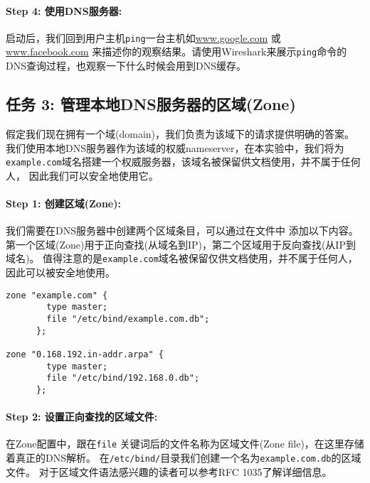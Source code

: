 \paragraph{Step 4: 使用DNS服务器:}
启动后，我们回到用户主机\texttt{ping}一台主机如\url{www.google.com} 或 \url{www.facebook.com}
来描述你的观察结果。请使用Wireshark来展示\texttt{ping}命令的DNS查询过程，也观察一下什么时候会用到DNS缓存。



\subsection{任务 3: 管理本地DNS服务器的区域(Zone)}

假定我们现在拥有一个域(domain)，我们负责为该域下的请求提供明确的答案。
我们使用本地DNS服务器作为该域的权威nameserver，在本实验中，我们将为
\texttt{example.com}域名搭建一个权威服务器，该域名被保留供文档使用，并不属于任何人，
因此我们可以安全地使用它。


\paragraph{Step 1: 创建区域(Zone):}
我们需要在DNS服务器中创建两个区域条目，可以通过在文件中
添加以下内容。第一个区域(Zone)用于正向查找(从域名到IP)，第二个区域用于反向查找(从IP到域名)。
值得注意的是\texttt{example.com}域名被保留仅供文档使用，并不属于任何人，因此可以被安全地使用。


\begin{lstlisting}
zone "example.com" {
        type master;
        file "/etc/bind/example.com.db";
      };

zone "0.168.192.in-addr.arpa" {
        type master;
        file "/etc/bind/192.168.0.db";
      };
\end{lstlisting}


\paragraph{Step 2: 设置正向查找的区域文件:}
在Zone配置中，跟在{\tt file} 关键词后的文件名称为区域文件(Zone file)，在这里存储着真正的DNS解析。
在\texttt{/etc/bind/}目录我们创建一个名为\texttt{example.com.db}的区域文件。
对于区域文件语法感兴趣的读者可以参考RFC 1035了解详细信息。

